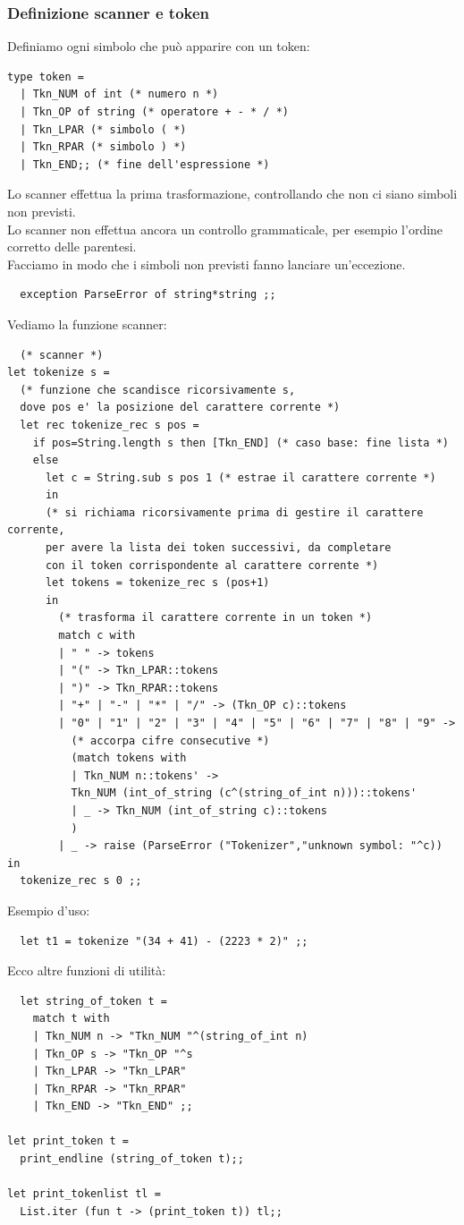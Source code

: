 \documentclass[12pt,a4paper]{article}
\begin{document}
\subsubsection{Definizione scanner e token}
Definiamo ogni simbolo che può apparire con un token:\
\begin{lstlisting}
type token =
  | Tkn_NUM of int (* numero n *)
  | Tkn_OP of string (* operatore + - * / *)
  | Tkn_LPAR (* simbolo ( *)
  | Tkn_RPAR (* simbolo ) *)
  | Tkn_END;; (* fine dell'espressione *)
\end{lstlisting}
Lo scanner effettua la prima trasformazione, controllando che non ci siano simboli non previsti.\\
Lo scanner non effettua ancora un controllo grammaticale, per esempio l'ordine corretto delle parentesi.\\
Facciamo in modo che i simboli non previsti fanno lanciare un'eccezione.
\begin{lstlisting}
  exception ParseError of string*string ;;
\end{lstlisting}
Vediamo la funzione scanner:
\begin{lstlisting}
  (* scanner *)
let tokenize s =
  (* funzione che scandisce ricorsivamente s,
  dove pos e' la posizione del carattere corrente *)
  let rec tokenize_rec s pos =
    if pos=String.length s then [Tkn_END] (* caso base: fine lista *)
    else 
      let c = String.sub s pos 1 (* estrae il carattere corrente *)
      in
      (* si richiama ricorsivamente prima di gestire il carattere corrente,
      per avere la lista dei token successivi, da completare
      con il token corrispondente al carattere corrente *)
      let tokens = tokenize_rec s (pos+1)
      in
        (* trasforma il carattere corrente in un token *)
        match c with
        | " " -> tokens
        | "(" -> Tkn_LPAR::tokens
        | ")" -> Tkn_RPAR::tokens
        | "+" | "-" | "*" | "/" -> (Tkn_OP c)::tokens
        | "0" | "1" | "2" | "3" | "4" | "5" | "6" | "7" | "8" | "9" ->
          (* accorpa cifre consecutive *)
          (match tokens with
          | Tkn_NUM n::tokens' ->
          Tkn_NUM (int_of_string (c^(string_of_int n)))::tokens'
          | _ -> Tkn_NUM (int_of_string c)::tokens
          )
        | _ -> raise (ParseError ("Tokenizer","unknown symbol: "^c))
in
  tokenize_rec s 0 ;;
\end{lstlisting}
Esempio d'uso:
\begin{lstlisting}
  let t1 = tokenize "(34 + 41) - (2223 * 2)" ;;
\end{lstlisting}
Ecco altre funzioni di utilità:
\begin{lstlisting}
  let string_of_token t =
    match t with
    | Tkn_NUM n -> "Tkn_NUM "^(string_of_int n)
    | Tkn_OP s -> "Tkn_OP "^s
    | Tkn_LPAR -> "Tkn_LPAR"
    | Tkn_RPAR -> "Tkn_RPAR"
    | Tkn_END -> "Tkn_END" ;;

let print_token t =
  print_endline (string_of_token t);;

let print_tokenlist tl =
  List.iter (fun t -> (print_token t)) tl;;
\end{lstlisting}
\end{document}
